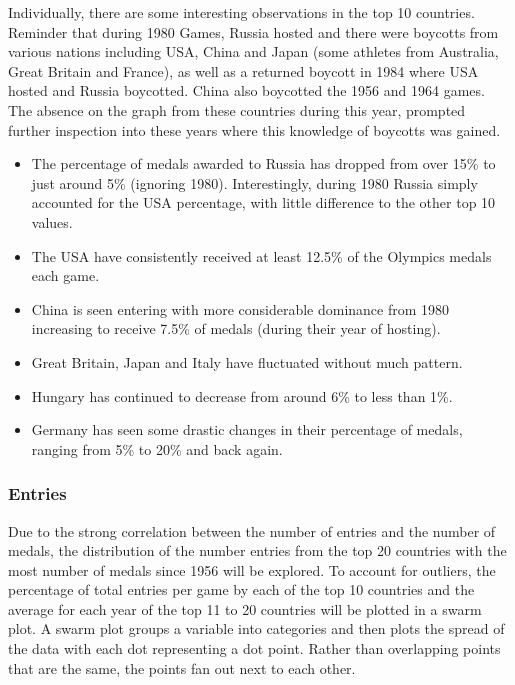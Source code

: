 \documentclass[a4 paper, 12pt]{article}
\begin{document}
        Individually, there are some interesting observations in the top 10 countries. Reminder that during 1980 Games, Russia hosted and there were boycotts from various nations including USA, China and Japan (some athletes from Australia, Great Britain and France), as well as a returned boycott in 1984 where USA hosted and Russia boycotted. China also boycotted the 1956 and 1964 games. The absence on the graph from these countries during this year, prompted further inspection into these years where this knowledge of boycotts was gained.
        \begin{itemize}
            \item The percentage of medals awarded to Russia has dropped from over 15\% to just around 5\% (ignoring 1980). Interestingly, during 1980 Russia simply accounted for the USA percentage, with little difference to the other top 10 values.
            \item The USA have consistently received at least 12.5\% of the Olympics medals each game.
            \item China is seen entering with more considerable dominance from 1980 increasing to receive 7.5\% of medals (during their year of hosting).
            \item Great Britain, Japan and Italy have fluctuated without much pattern.
            \item Hungary has continued to decrease from around 6\% to less than 1\%.
            \item Germany has seen some drastic changes in their percentage of medals, ranging from 5\% to 20\% and back again. 
        \end{itemize}   

        \subsubsection{Entries}
        Due to the strong correlation between the number of entries and the number of medals, the distribution of the number entries from the top 20 countries with the most number of medals since 1956 will be explored. To account for outliers, the percentage of total entries per game by each of the top 10 countries and the average for each year of the top 11 to 20 countries will be plotted in a swarm plot. A swarm plot groups a variable into categories and then plots the spread of the data with each dot representing a dot point. Rather than overlapping points that are the same, the points fan out next to each other. 
\end{document}
